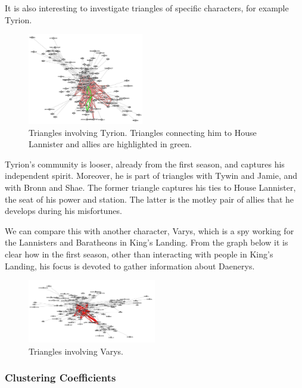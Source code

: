 \documentclass[10pt,twocolumn,letterpaper]{article}
\begin{document}
It is also interesting to investigate triangles of specific characters, for example Tyrion.

\begin{figure}[!h]
    \centering
    \includegraphics[width=0.45\textwidth]{img/s1/triangles_tyrion.jpg}
    \caption{\small{Triangles involving Tyrion. Triangles connecting him to House Lannister and allies are highlighted in green.}}
\end{figure}

Tyrion's community is looser, already from the first season, and captures his independent spirit. Moreover, he is part of triangles with Tywin and Jamie, and with Bronn and Shae. The former triangle captures his ties to House Lannister, the seat of his power and station. The latter is the motley pair of allies that he develops during his misfortunes.

We can compare this with another character, Varys, which is a spy working for the Lannisters and Baratheons in King's Landing. From the graph below it is clear how in the first season, other than interacting with people in King's Landing, his focus is devoted to gather information about Daenerys. 

\begin{figure}[!h]
    \centering
    \includegraphics[width=0.5\textwidth]{img/s1/triangles_varys.jpg}
    \caption{\small{Triangles involving Varys.}}
\end{figure}

\subsubsection{Clustering Coefficients}
\end{document}
